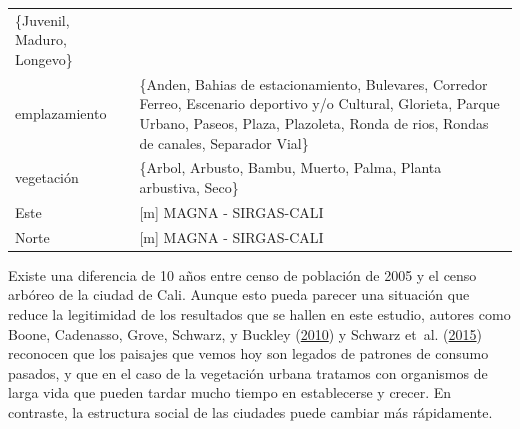 \documentclass[12pt,a4paper,oneside, openany]{book}
\theoremstyle{definition}
\theoremstyle{definition}
\theoremstyle{definition}
\theoremstyle{remark}
\begin{document}
\begin{longtable}[]{@{}ll@{}}
\begin{minipage}[t]{0.42\columnwidth}
\{Juvenil, Maduro, Longevo\}\strut
\end{minipage}\tabularnewline
\begin{minipage}[t]{0.30\columnwidth}\raggedright\strut
emplazamiento\strut
\end{minipage} & \begin{minipage}[t]{0.42\columnwidth}\raggedright\strut
\{Anden, Bahias de estacionamiento, Bulevares, Corredor Ferreo,
Escenario deportivo y/o Cultural, Glorieta, Parque Urbano, Paseos,
Plaza, Plazoleta, Ronda de rios, Rondas de canales, Separador
Vial\}\strut
\end{minipage}\tabularnewline
\begin{minipage}[t]{0.30\columnwidth}\raggedright\strut
vegetación\strut
\end{minipage} & \begin{minipage}[t]{0.42\columnwidth}\raggedright\strut
\{Arbol, Arbusto, Bambu, Muerto, Palma, Planta arbustiva, Seco\}\strut
\end{minipage}\tabularnewline
\begin{minipage}[t]{0.30\columnwidth}\raggedright\strut
Este\strut
\end{minipage} & \begin{minipage}[t]{0.42\columnwidth}\raggedright\strut
{[}m{]} MAGNA - SIRGAS-CALI\strut
\end{minipage}\tabularnewline
\begin{minipage}[t]{0.30\columnwidth}\raggedright\strut
Norte\strut
\end{minipage} & \begin{minipage}[t]{0.42\columnwidth}\raggedright\strut
{[}m{]} MAGNA - SIRGAS-CALI\strut
\end{minipage}\tabularnewline
\bottomrule
\end{longtable}

Existe una diferencia de 10 años entre censo de población de 2005 y el
censo arbóreo de la ciudad de Cali. Aunque esto pueda parecer una
situación que reduce la legitimidad de los resultados que se hallen en
este estudio, autores como Boone, Cadenasso, Grove, Schwarz, y Buckley
(\protect\hyperlink{ref-boone2010landscape}{2010}) y Schwarz et~al.
(\protect\hyperlink{ref-schwarz_trees_2015}{2015}) reconocen que los
paisajes que vemos hoy son legados de patrones de consumo pasados, y que
en el caso de la vegetación urbana tratamos con organismos de larga vida
que pueden tardar mucho tiempo en establecerse y crecer. En contraste,
la estructura social de las ciudades puede cambiar más rápidamente.
\end{document}
